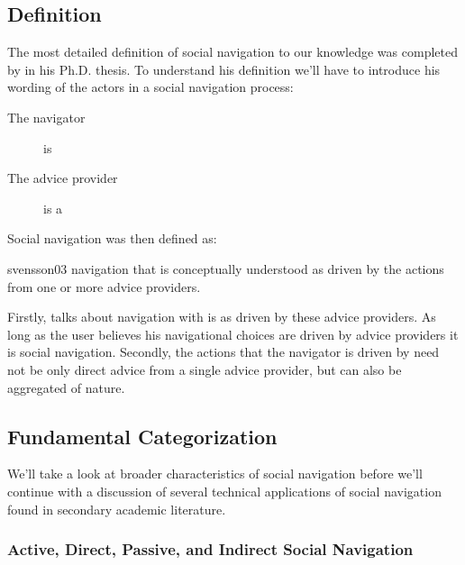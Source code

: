 \subsection{Definition}

The most detailed definition of social navigation to our knowledge was
completed by \citet{svensson03} in his Ph.D. thesis. To understand his
definition we'll have to introduce his wording of the actors in a social
navigation process:

\begin{description}
  \item[The navigator] is
  \item[The advice provider] is a
\end{description}

Social navigation was then defined as:

\begin{citequote}[p.~20]{svensson03}
  navigation that is conceptually understood as driven by the actions from one
  or more advice providers.
\end{citequote}

Firstly, \citeauthor{svensson03} talks about navigation with is
 as driven by these advice providers. As long as
the user believes his navigational choices are driven by advice providers it
is social navigation. Secondly, the actions that the navigator is driven by
need not be only direct advice from a single advice provider, but can also be
aggregated of nature.

\subsection{Fundamental Categorization}

We'll take a look at broader characteristics of social navigation
before we'll continue with a discussion of several technical applications of
social navigation found in secondary academic literature.

\subsubsection{Active, Direct, Passive, and Indirect Social Navigation}

